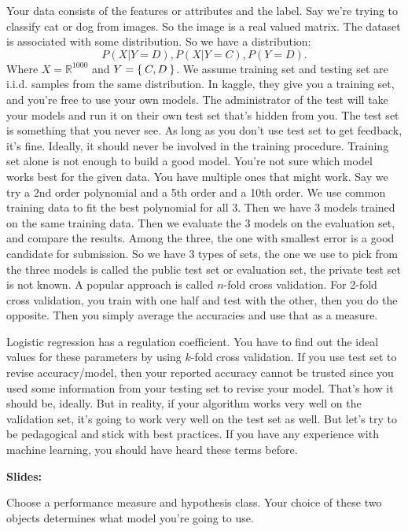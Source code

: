 \documentclass{amsbook}
\theoremstyle{plain}
\numberwithin{section}{chapter}
\numberwithin{equation}{chapter}
\theoremstyle{definition}
\theoremstyle{remark}
\newcommand{\R}{\mathbb{R}}
\begin{document}
Your data consists of the features or attributes and the label. Say we're trying to classify cat or dog from images. So the image is a real valued matrix. The dataset is associated with some distribution. So we have a distribution:
$$
P(X|Y = D),P(X|Y = C),P(Y = D).
$$
Where $X = \R^{1000}$ and $Y = \Set{C,D}$. We assume training set and testing set are i.i.d. samples from the same distribution. In kaggle, they give you a training set, and you're free to use your own models. The administrator of the test will take your models and run it on their own test set that's hidden from you. The test set is something that you never see. As long as you don't use test set to get feedback, it's fine. Ideally, it should never be involved in the training procedure. Training set alone is not enough to build a good model. You're not sure which model works best for the given data. You have multiple ones that might work. Say we try a 2nd order polynomial and a 5th order and a 10th order. We use common training data to fit the best polynomial for all 3. Then we have 3 models trained on the same training data. Then we evaluate the 3 models on the evaluation set, and compare the results. Among the three, the one with smallest error is a good candidate for submission. So we have 3 types of sets, the one we use to pick from the three models is called the public test set or evaluation set, the private test set is not known. A popular approach is called $n$-fold cross validation. For 2-fold cross validation, you train with one half and test with the other, then you do the opposite. Then you simply average the accuracies and use that as a measure. 

Logistic regression has a regulation coefficient. You have to find out the ideal values for these parameters by using $k$-fold cross validation. If you use test set to revise accuracy/model, then your reported accuracy cannot be trusted since you used some information from your testing set to revise your model. That's how it should be, ideally. But in reality, if your algorithm works very well on the validation set, it's going to work very well on the test set as well. But let's try to be pedagogical and stick with best practices. If you have any experience with machine learning, you should have heard these terms before. 


\textbf{Slides:}

Choose a performance measure and hypothesis class. Your choice of these two objects determines what model you're going to use. 
\end{document}
